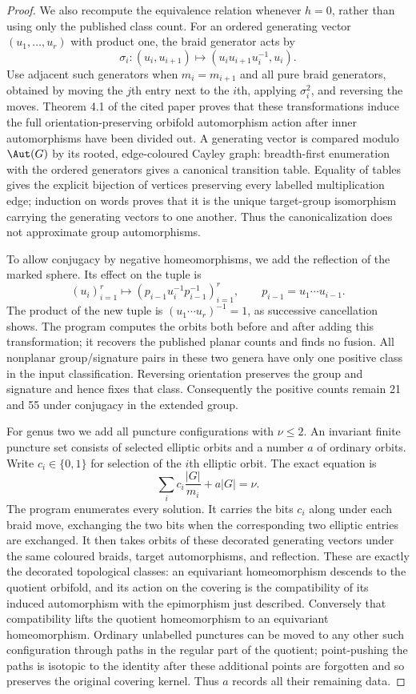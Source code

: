 \begin{proof}
We also recompute the equivalence relation whenever $h=0$,
rather than using only the published class count. For an ordered
generating vector $(u_1,\ldots,u_r)$ with product one, the braid
generator acts by
\[
 \sigma_i:(u_i,u_{i+1})\longmapsto
               (u_i u_{i+1}u_i^{-1},u_i).
\]
Use adjacent such generators when $m_i=m_{i+1}$ and all pure
braid generators, obtained by moving the $j$th entry next to the
$i$th, applying $\sigma_i^2$, and reversing the moves.
Theorem 4.1 of the cited paper proves that these transformations
induce the full orientation-preserving orbifold automorphism
action after inner automorphisms have been divided out. A
generating vector is compared modulo $\Aut(G)$ by its rooted,
edge-coloured Cayley graph: breadth-first enumeration with the
ordered generators gives a canonical transition table. Equality
of tables gives the explicit bijection of vertices preserving
every labelled multiplication edge; induction on words proves
that it is the unique target-group isomorphism carrying the
generating vectors to one another. Thus the canonicalization
does not approximate group automorphisms.

To allow conjugacy by negative homeomorphisms, we add the
reflection of the marked sphere. Its effect on the tuple is
\[
 (u_i)_{i=1}^r\longmapsto
 \left(p_{i-1}u_i^{-1}p_{i-1}^{-1}\right)_{i=1}^r,
 \qquad p_{i-1}=u_1\cdots u_{i-1}.
\]
The product of the new tuple is $(u_1\cdots u_r)^{-1}=1$,
as successive cancellation shows. The program computes the
orbits both before and after adding this transformation; it
recovers the published planar counts and finds no fusion.
All nonplanar group/signature pairs in these two genera have
only one positive class in the input classification. Reversing
orientation preserves the group and signature and hence fixes
that class. Consequently the positive counts remain 21 and 55
under conjugacy in the extended group.

For genus two we add all puncture configurations with
$\nu\leq2$. An invariant finite puncture set consists of selected
elliptic orbits and a number $a$ of ordinary orbits. Write
$c_i\in\{0,1\}$ for selection of the $i$th elliptic orbit.
The exact equation is
\[
                  \sum_i c_i\frac{|G|}{m_i}+a|G|=\nu.
                                                               \tag{B.33.1}
\]
The program enumerates every solution. It carries the bits
$c_i$ along under each braid move, exchanging the two bits
when the corresponding two elliptic entries are exchanged.
It then takes orbits of these decorated generating vectors
under the same coloured braids, target automorphisms, and
reflection. These are exactly the decorated topological
classes: an equivariant homeomorphism descends to the quotient
orbifold, and its action on the covering is the compatibility
of its induced automorphism with the epimorphism just described.
Conversely that compatibility lifts the quotient homeomorphism
to an equivariant homeomorphism. Ordinary unlabelled punctures
can be moved to any other such configuration through paths in
the regular part of the quotient; point-pushing the paths is
isotopic to the identity after these additional points are
forgotten and so preserves the original covering kernel.
Thus $a$ records all their remaining data.


\end{proof}
